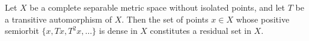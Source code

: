 Let $X$ be a complete separable metric space without isolated points, and let $T$ be a transitive automorphism of $X$. Then the set of points $x \in X$ whose positive semiorbit $\{x, Tx, T^2x, \ldots\}$ is dense in $X$ constitutes a residual set in $X$.
